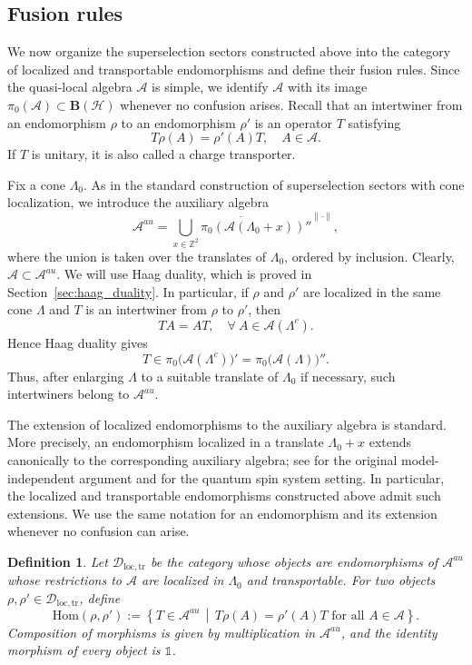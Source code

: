 \documentclass[a4paper,11pt]{article}
\newtheorem{definition}[theorem]{Definition}
\theoremstyle{definition}
\theoremstyle{remark}
\theoremstyle{remark}
\newcommand\Hom {\mathrm{Hom}}
\begin{document}
\subsection{Fusion rules}  \label{subsec:fusion}

We now organize the superselection sectors constructed above into the category of localized and transportable endomorphisms and define their fusion rules. Since the quasi-local algebra $\mathcal A$ is simple, we identify $\mathcal A$ with its image $\pi_0(\mathcal A)\subset \mathbf B(\mathcal H)$ whenever no confusion
arises. Recall that an intertwiner from an endomorphism $\rho$ to an endomorphism $\rho'$ is an operator $T$ satisfying 
\[
    T\rho(A)=\rho'(A)T, \quad A\in\mathcal A. 
\]
If $T$ is unitary, it is also called a charge transporter.

Fix a cone $\Lambda_0$. As in the standard construction of superselection sectors with cone localization, we introduce the auxiliary algebra
\begin{equation*}
    \mathcal{A}^{au} = \overline{\bigcup_{x\in \mathbb{Z}^2} \pi_0(\mathcal{A}(\Lambda_0+x))''}^{\|\cdot\|}, 
\end{equation*}
where the union is taken over the translates of $\Lambda_0$, ordered by inclusion. Clearly, $\mathcal A\subset\mathcal A^{au}$. We will use Haag duality, which is proved in Section~\ref{sec:haag_duality}. In particular, if $\rho$ and $\rho'$ are localized in the same cone $\Lambda$ and $T$ is an intertwiner from $\rho$ to $\rho'$, then
\[
    TA = AT, \quad \forall~A\in\mathcal A(\Lambda^c).
\]
Hence Haag duality gives
\[
    T\in \pi_0\bigl(\mathcal A(\Lambda^c)\bigr)' = \pi_0\bigl(\mathcal A(\Lambda)\bigr)''.
\]
Thus, after enlarging $\Lambda$ to a suitable translate of $\Lambda_0$ if necessary, such intertwiners belong to $\mathcal A^{au}$.

The extension of localized endomorphisms to the auxiliary algebra is standard. More precisely, an endomorphism localized in a translate $\Lambda_0+x$ extends canonically to the corresponding auxiliary algebra; see \cite[Lemma~4.1]{Buchholz1982locality} for the original model-independent argument and \cite{Ogata2022braided} for the quantum spin system setting. In particular, the localized and transportable endomorphisms constructed above admit such extensions. We use the same notation for an endomorphism and its extension whenever no confusion can arise.

\begin{definition}\label{def:Dloc}
    Let $\mathcal D_{\mathrm{loc,tr}}$ be the category whose objects are endomorphisms of $\mathcal A^{au}$ whose restrictions to $\mathcal A$ are localized in $\Lambda_0$ and transportable. For two objects $\rho,\rho'\in\mathcal D_{\mathrm{loc,tr}}$, define
    \[
        \Hom(\rho,\rho'):=\left\{T\in\mathcal A^{au}\,\middle|\,T\rho(A)=\rho'(A)T\text{ for all }A\in\mathcal A\right\}.
    \]
    Composition of morphisms is given by multiplication in $\mathcal A^{au}$, and the identity morphism of every object is $\mathds{1}$.
\end{definition}
\end{document}
